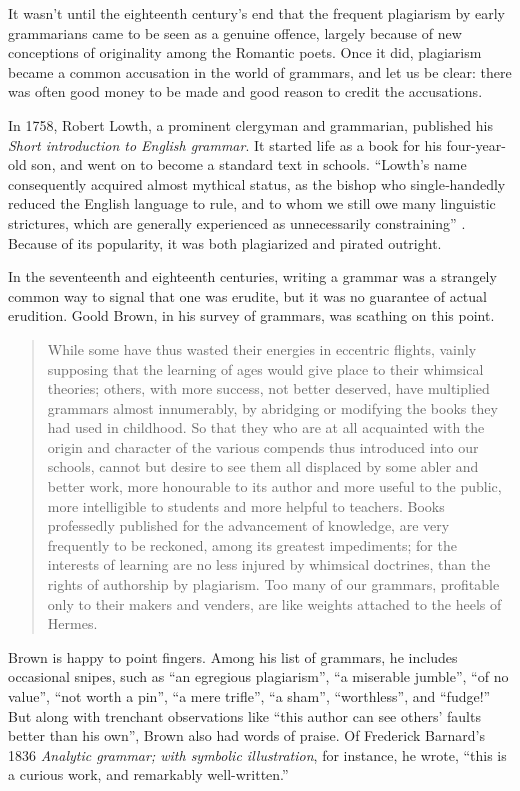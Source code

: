 It wasn't until the eighteenth century's end that the frequent plagiarism
by early grammarians came to be seen as a genuine offence, largely
because of new conceptions of originality among the Romantic poets. Once
it did, plagiarism became a common accusation in the world of grammars,
and let us be clear: there was often good money to be made and good reason to credit the accusations.

In 1758, Robert Lowth, a prominent clergyman and grammarian, published his \textit{Short introduction to English grammar}. It started life as a book for his four-year-old son, and went on to become a standard text in schools. \enquote{Lowth's name consequently acquired almost mythical status, as the bishop who single‐handedly reduced the English language to rule, and to whom we still owe many linguistic strictures, which are generally experienced as unnecessarily constraining} \citep[1]{Ostade2011a}. Because of its popularity, it was both plagiarized and pirated outright.

In the seventeenth and eighteenth centuries, writing a grammar was a
strangely common way to signal that one was erudite, but it was no
guarantee of actual erudition. Goold Brown, in his survey of grammars,
was scathing on this point.

\begin{quote}
    While some have thus wasted their energies in eccentric flights, vainly supposing that the learning of ages would give place to their whimsical theories; others, with more success, not better deserved, have multiplied grammars almost innumerably, by abridging or modifying the books they had used in childhood. So that they who are at all acquainted with the origin and character of the various compends thus introduced into our schools, cannot but desire to see them all displaced by some abler and better work, more honourable to its author and more useful to the public, more intelligible to students and more helpful to teachers. Books professedly published for the advancement of knowledge, are very frequently to be reckoned, among its greatest impediments; for the interests of learning are no less injured by whimsical doctrines, than the rights of authorship by plagiarism. Too many of our grammars, profitable only to their makers and venders, are like weights attached to the heels of Hermes. \\ \phantom{xxx}\hfill \citep[35]{brown_grammar_grammars}
\end{quote}

Brown is happy to point fingers. Among his list of grammars, he includes occasional snipes, such as \enquote{an egregious plagiarism}, \enquote{a miserable jumble}, \enquote{of no value}, \enquote{not worth a pin}, \enquote{a mere trifle}, \enquote{a sham}, \enquote{worthless}, and \enquote{fudge!} But along with trenchant observations like \enquote{this author can see others' faults better than his own}, Brown also had words of praise. Of Frederick Barnard's 1836 \textit{Analytic grammar; with symbolic illustration}, for instance, he wrote, \enquote{this is a curious work, and remarkably well-written.}

